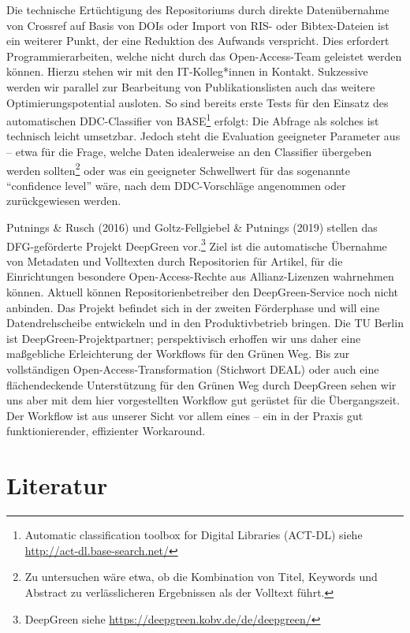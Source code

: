 \documentclass[a4paper,
fontsize=11pt,
oneside,
numbers=noperiodatend,
parskip=half-,
bibliography=totoc,
final
]{scrartcl}
\begin{document}
Die technische Ertüchtigung des Repositoriums durch direkte
Datenübernahme von Crossref auf Basis von DOIs oder Import von RIS- oder
Bibtex-Dateien ist ein weiterer Punkt, der eine Reduktion des Aufwands
verspricht. Dies erfordert Programmierarbeiten, welche nicht durch das
Open-Access-Team geleistet werden können. Hierzu stehen wir mit den
IT-Kolleg*innen in Kontakt. Sukzessive werden wir parallel zur
Bearbeitung von Publikationslisten auch das weitere
Optimierungspotential ausloten. So sind bereits erste Tests für den
Einsatz des automatischen DDC-Classifier von BASE\footnote{Automatic
  classification toolbox for Digital Libraries (ACT-DL) siehe
  \url{http://act-dl.base-search.net/}} erfolgt: Die Abfrage als solches
ist technisch leicht umsetzbar. Jedoch steht die Evaluation geeigneter
Parameter aus -- etwa für die Frage, welche Daten idealerweise an den
Classifier übergeben werden sollten\footnote{Zu untersuchen wäre etwa,
  ob die Kombination von Titel, Keywords und Abstract zu verlässlicheren
  Ergebnissen als der Volltext führt.} oder was ein geeigneter
Schwellwert für das sogenannte \enquote{confidence level} wäre, nach dem
DDC-Vorschläge angenommen oder zurückgewiesen werden.

Putnings \& Rusch (2016) und Goltz-Fellgiebel \& Putnings (2019) stellen
das DFG-geförderte Projekt DeepGreen vor.\footnote{DeepGreen siehe
  \url{https://deepgreen.kobv.de/de/deepgreen/}} Ziel ist die
automatische Übernahme von Metadaten und Volltexten durch Repositorien
für Artikel, für die Einrichtungen besondere Open-Access-Rechte aus
Allianz-Lizenzen wahrnehmen können. Aktuell können Repositorienbetreiber
den DeepGreen-Service noch nicht anbinden. Das Projekt befindet sich in
der zweiten Förderphase und will eine Datendrehscheibe entwickeln und in
den Produktivbetrieb bringen. Die TU Berlin ist
Deep\-Green-Projektpartner; perspektivisch erhoffen wir uns daher eine
maßgebliche Erleichterung der Workflows für den Grünen Weg. Bis zur
vollständigen Open-Access-Transformation (Stichwort DEAL) oder auch eine
flächendeckende Unterstützung für den Grünen Weg durch DeepGreen sehen
wir uns aber mit dem hier vorgestellten Workflow gut gerüstet für die
Übergangszeit. Der Workflow ist aus unserer Sicht vor allem eines -- ein
in der Praxis gut funktionierender, effizienter Workaround.

\hypertarget{literatur}{%
\section{Literatur}\label{literatur}}
\end{document}
